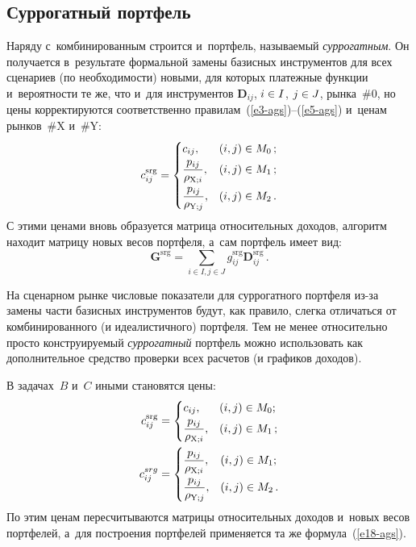 \begin{multicols}{2}
  \subsection{Суррогатный портфель }
  
  Наряду с~комбинированным строится и~портфель, называемый 
\textit{суррогатным}. Он получается в~результате формальной замены 
базисных инструментов для всех сценариев (по необходимости) новыми, для 
которых платежные функции и~вероятности те же, что и~для инструментов 
$\boldsymbol{D}_{ij}$, $i \hm\in I$, $j \hm\in J$, рынка~\#0, но цены 
корректируются соответственно правилам~(\ref{e3-ags})--(\ref{e5-ags}) 
и~ценам рынков~\#X и~\#Y: 
  \begin{equation}
  c_{ij}^{\mathrm{srg}}=%
  \begin{cases}
  c_{ij}, & (i,j)\in M_0\,;\\
  \fr{p_{ij}}{\rho_{\mathrm{X};i}},  &(i,j)\in M_1\,;\\
  \fr{p_{ij}}{\rho_{\mathrm{Y};j}}, &(i,j)\in M_2\,.
  \end{cases}
  \label{e17-ags}
  \end{equation}
  С этими ценами вновь образуется матрица относительных доходов, алгоритм 
находит матрицу новых весов портфеля, а~сам портфель имеет вид: 
  \begin{equation}
  \boldsymbol{G}^{\mathrm{srg}}=\sum\limits_{i\in I, j\in J} g_{ij}^{\mathrm{srg}} 
\boldsymbol{D}_{ij}^{\mathrm{srg}}\,.
  \label{e18-ags}
  \end{equation}
  
  На сценарном рынке числовые показатели для суррогатного портфеля из-за 
замены части базисных инструментов будут, как правило, слегка отличаться от 
комбинированного (и идеалистичного) портфеля. Тем не менее относительно 
просто конструируемый \textit{суррогатный} портфель можно использовать 
как дополнительное средство проверки всех расчетов (и графиков доходов). 
  
  В задачах~$B$ и~$C$ иными становятся цены: 
  \begin{align*}
  c_{ij}^{\mathrm{srg}} &= %
  \begin{cases}
  c_{ij}, &(i,j)\in M_0;\\
  \fr{p_{ij}}{\rho_{\mathrm{X};i}}, & (i,j)\in M_1\,;
    \end{cases}%
    \\
  c_{ij}^{srg} &= 
  \begin{cases}
  \fr{p_{ij}}{\rho_{\mathrm{X};i}},& (i,j)\in M_1;\\
\fr{p_{ij}}{\rho_{\mathrm{Y};j}}, &(i,j)\in M_2\,.
\end{cases}
  \end{align*}
  По этим ценам пересчитываются матрицы относительных доходов и~новых 
весов портфелей, а~для построения портфелей применяется та же 
формула~(\ref{e18-ags}). 
  

\end{multicols}
